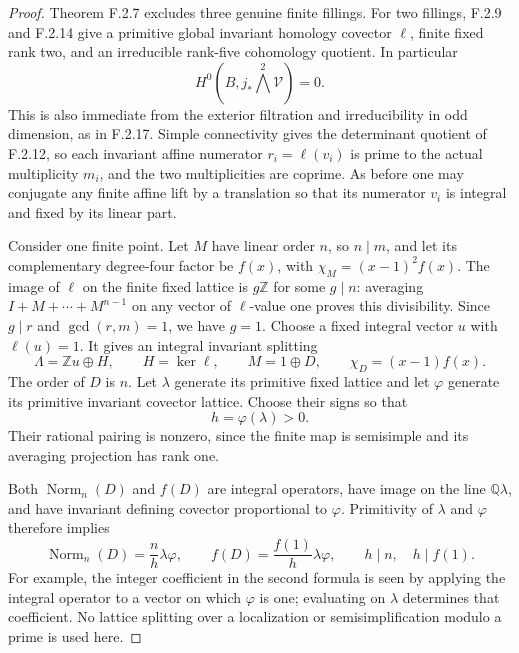 \begin{proof}
Theorem F.2.7 excludes three genuine finite fillings.
For two fillings, F.2.9 and F.2.14 give a primitive global
invariant homology covector $\ell$, finite fixed rank two,
and an irreducible rank-five cohomology quotient.
In particular
\[
 H^0(B,j_*\bigwedge^2\mathcal V)=0.
 \tag{F.S2}
\]
This is also immediate from the exterior filtration and
irreducibility in odd dimension, as in F.2.17.
Simple connectivity gives the determinant quotient of
F.2.12, so each invariant affine numerator $r_i=\ell(v_i)$
is prime to the actual multiplicity $m_i$, and the two
multiplicities are coprime.
As before one may conjugate any finite affine lift by a
translation so that its numerator $v_i$ is integral and
fixed by its linear part.

Consider one finite point.  Let $M$ have linear order $n$,
so $n\mid m$, and let its complementary degree-four factor
be $f(x)$, with
$\chi_M=(x-1)^2f(x)$.
The image of $\ell$ on the finite fixed lattice is $g\mathbb Z$
for some $g\mid n$: averaging $I+M+\cdots+M^{n-1}$ on
any vector of $\ell$-value one proves this divisibility.
Since $g\mid r$ and $\gcd(r,m)=1$, we have $g=1$.
Choose a fixed integral vector $u$ with $\ell(u)=1$.
It gives an integral invariant splitting
\[
 \Lambda=\mathbb Zu\oplus H,
 \qquad H=\ker\ell,\qquad M=1\oplus D,
 \qquad\chi_D=(x-1)f(x).
 \tag{F.S3}
\]
The order of $D$ is $n$.
Let $\lambda$ generate its primitive fixed lattice and
let $\varphi$ generate its primitive invariant covector
lattice.  Choose their signs so that
\[
 h=\varphi(\lambda)>0.
 \tag{F.S4}
\]
Their rational pairing is nonzero, since the finite map
is semisimple and its averaging projection has rank one.

Both $\operatorname{Norm}_n(D)$ and $f(D)$ are integral
operators, have image on the line $\mathbb Q\lambda$,
and have invariant defining covector proportional to
$\varphi$.  Primitivity of $\lambda$ and $\varphi$
therefore implies
\[
 \operatorname{Norm}_n(D)=\frac n h\lambda\varphi,
 \qquad
 f(D)=\frac{f(1)}h\lambda\varphi,
 \qquad h\mid n,\quad h\mid f(1).
 \tag{F.S5}
\]
For example, the integer coefficient in the second formula
is seen by applying the integral operator to a vector on
which $\varphi$ is one; evaluating on $\lambda$ determines
that coefficient.  No lattice splitting over a localization
or semisimplification modulo a prime is used here.


\end{proof}

